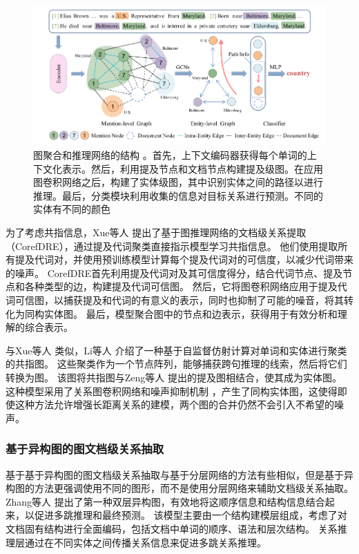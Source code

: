 \documentclass[bachelor]{thesis-uestc}
\begin{document}
\begin{figure}
    \centering
    \includegraphics[width=0.8\linewidth]{misc/GAIN.png}
    \caption{图聚合和推理网络的结构 \cite{GAIN}。首先，上下文编码器获得每个单词的上下文化表示。然后，利用提及节点和文档节点构建提及级图。在应用图卷积网络之后，构建了实体级图，其中识别实体之间的路径以进行推理。最后，分类模块利用收集的信息对目标关系进行预测。不同的实体有不同的颜色}
\end{figure}\label{fig:GAIN}

为了考虑共指信息，Xue等人 \cite{y2020-coreferential}提出了基于图推理网络的文档级关系提取（CorefDRE），通过提及代词聚类直接指示模型学习共指信息。
他们使用提取所有提及代词对，并使用预训练模型计算每个提及代词对的可信度，以减少代词带来的噪声。
CorefDRE首先利用提及代词对及其可信度得分，结合代词节点、提及节点和各种类型的边，构建提及代词可信图。
然后，它将图卷积网络应用于提及代词可信图，以捕获提及和代词的有意义的表示，同时也抑制了可能的噪音，将其转化为同构实体图。
最后，模型聚合图中的节点和边表示，获得用于有效分析和理解的综合表示。\par

与Xue等人 \cite{y2020-coreferential}类似，Li等人 \cite{LI2022109146}介绍了一种基于自监督仿射计算对单词和实体进行聚类的共指图。
这些聚类作为一个节点阵列，能够捕获跨句推理的线索，然后将它们转换为图。
该图将共指图与Zeng等人 \cite{GAIN}提出的提及图相结合，使其成为实体图。
这种模型采用了关系图卷积网络和噪声抑制机制 \cite{y2020-coreferential}，产生了同构实体图，这使得即使这种方法允许增强长距离关系的建模，两个图的合并仍然不会引入不希望的噪声。\par

\subsubsection{基于异构图的图文档级关系抽取}\label{subsec:heterogeneous-graph}
基于基于异构图的图文档级关系抽取与基于分层网络的方法有些相似，但是基于异构图的方法更强调使用不同的图形，而不是使用分层网络来辅助文档级关系抽取。
Zhang等人 \cite{zhang-etal-2020-document}提出了第一种双层异构图，有效地将这顺序信息和结构信息结合起来，以促进多跳推理和最终预测。
该模型主要由一个结构建模层组成，考虑了对文档固有结构进行全面编码，包括文档中单词的顺序、语法和层次结构。
关系推理层通过在不同实体之间传播关系信息来促进多跳关系推理。\par
\end{document}
